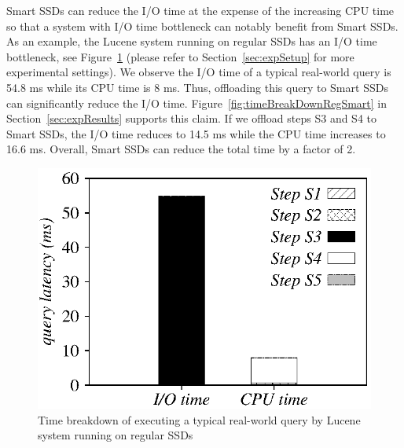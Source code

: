 Smart SSDs can reduce the I/O time at the expense of the increasing CPU time so that a system with I/O time bottleneck can notably benefit from Smart SSDs. As an example, the Lucene system running on regular SSDs has an I/O time bottleneck, see Figure~\ref{fig:timeBreakDownRegularSSD} (please refer to Section~\ref{sec:expSetup} for more experimental settings). We observe the I/O time of a typical real-world query is 54.8 ms while its CPU time is 8 ms. Thus, offloading this query to Smart SSDs can significantly reduce the I/O time. Figure~\ref{fig:timeBreakDownRegSmart} in Section~\ref{sec:expResults} supports this claim.  If we offload steps S3 and S4 to Smart SSDs, the I/O time reduces to 14.5 ms while the CPU time increases to 16.6 ms. Overall, Smart SSDs can reduce the total time by a factor of 2.




\begin{figure}[htbp]
	\centering
		\includegraphics[width=0.55\columnwidth]{figures/timeBreakDownRegularSSD.eps}
	\caption{Time breakdown of executing a typical real-world query by Lucene system running on regular SSDs}
	\label{fig:timeBreakDownRegularSSD}
\end{figure}




